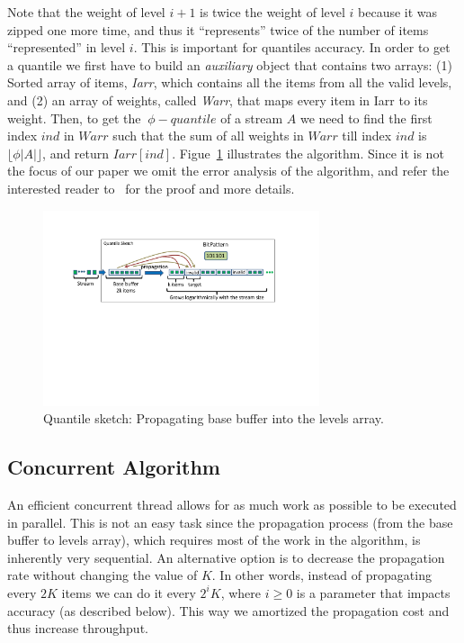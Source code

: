 Note that the weight of level $i+1$ is twice the weight of level
$i$ because it was zipped one more time, and thus it
``represents'' twice of the number of items ``represented'' in
level $i$.
This is important for quantiles accuracy.
In order to get a quantile we first have to build an
\emph{auxiliary} object that contains two arrays:
(1) Sorted array of items, \emph{Iarr}, which 
contains all the items from all the valid levels, and (2) an
array of weights, called \emph{Warr}, that maps every item in
Iarr to its weight.
Then, to get the $~\phi - quantile$ of a stream $A$
we need to find the first index $ind$ in $Warr$ such that the
sum of all weights in $Warr$ till index $ind$ is $\lfloor \phi |A|
\rfloor$, and return $Iarr[ind]$.
Figue~\ref{fig:quantilesMerge} illustrates the algorithm.
Since it is not the focus of our paper we omit the error analysis
of the algorithm, and refer the interested reader to~\cite{} for
the proof and more details.

\begin{figure}[tb]
    \centering
    \includegraphics[width=3.2in]{images/quantilesPropogation.pdf}
    \caption{Quantile sketch: Propagating base buffer
    into the levels array.}
    \label{fig:quantilesMerge}
\end{figure}


\subsection{Concurrent Algorithm}

An efficient concurrent thread allows for as much work as possible to be executed in parallel.
This is not an easy task since the propagation process (from the base buffer to levels
array), which requires most of the work in the algorithm, is
inherently very sequential.
An alternative option is to decrease the propagation rate without changing
the value of $K$. 
In other words, instead of propagating every $2K$ items we can
do it every $2^{i}K$, where $i \geq 0$ is a parameter that
impacts accuracy (as described below).
This way we amortized the propagation cost and thus increase
throughput.

